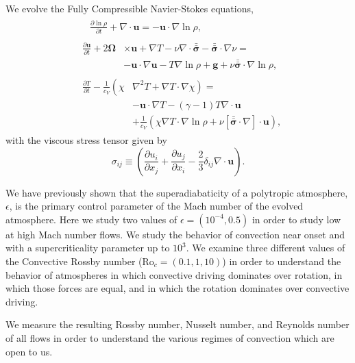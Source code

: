 \documentclass[aps, prl, twocolumn, nofootinbib, groupedaddress, amsfonts, amssymb, amsmath]{revtex4-1}
\newcommand{\grad}{\ensuremath{\nabla}}
\newcommand{\lilstressT}{\ensuremath{\bm{\bar{\bar{\sigma}}}}}
\begin{document}
We evolve the Fully Compressible Navier-Stokes equations,
\begin{align}
&\begin{aligned}
&\frac{\partial \ln\rho}{\partial t} + \grad\cdot\bm{u} 
    = -\bm{u}\cdot\grad\ln\rho,
	\label{eqn:continuity_eqn}
\end{aligned}\\
&\begin{aligned}
\frac{\partial\bm{u}}{\partial t} + 2\bm{\Omega}&\times\bm{u} + \grad T - 
\nu\grad\cdot\lilstressT - \lilstressT\cdot\grad\nu = \\
&-\bm{u}\cdot\grad\bm{u} - T\grad\ln\rho + \bm{g} + 
\nu\lilstressT\cdot\grad\ln\rho,
\label{eqn:momentum_eqn}
\end{aligned}\\
&\begin{aligned}
\frac{\partial T}{\partial t} -\frac{1}{c_V}\left(\right.\chi&\left.
    \grad^2 T + \grad T\cdot\grad\chi\right) = \\
	&-\bm{u}\cdot\grad T - (\gamma-1)T\grad\cdot{\bm{u}} \\
	&+ \frac{1}{c_V}\left(\chi\grad T \cdot\grad\ln\rho +
	\nu\left[\lilstressT\cdot\nabla\right]\cdot\bm{u}\right), 
	\label{eqn:energy_eqn}
\end{aligned}
\end{align}
with the viscous stress tensor given by
\begin{equation}
\sigma_{ij} \equiv \left(\frac{\partial u_i}{\partial x_j} + 
\frac{\partial u_j}{\partial x_i} - \frac{2}{3}\delta_{ij}\grad\cdot\bm{u}\right).
	\label{eqn:stress_tensor}
\end{equation}

We have previously shown that the superadiabaticity of a polytropic atmosphere, $\epsilon$,
is the primary control parameter of the Mach number of the evolved atmosphere.  Here we study
two values of $\epsilon = (10^{-4}, 0.5)$ in order to study low at high Mach number flows.  We
study the behavior of convection near onset and with a supercriticality parameter up to $10^3$.
We examine three different values of the Convective Rossby number
(Ro$_c = (0.1, 1, 10)$) in order to understand the behavior of atmospheres in which convective
driving dominates over rotation, in which those forces are equal, and in which the rotation
dominates over convective driving.

We measure the resulting Rossby number, Nusselt number, and Reynolds number of all flows in order to
understand the various regimes of convection which are open to us.
\end{document}
